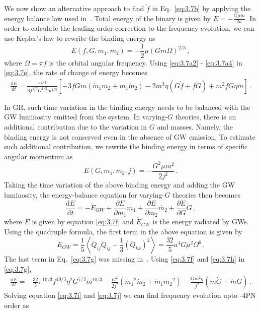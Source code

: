 \documentclass[11pt]{article}
\begin{document}
  \hspace{15.5pt} We now show an alternative approach to find $\dot f$ in Eq.~\eqref{eq:3.7b} by applying the energy balance law used in~\cite{Yunes:2009bv}. Total energy of the binary is given by $E=-\frac{G\mu m}{2a}$. In order to calculate the leading order correction to the frequency evolution, we can use Kepler's law to rewrite the binding energy as 
 \begin{equation}\label{eq:3.7e}
 E(f,G,m_1,m_2)=-\frac{1}{2}\mu (Gm\Omega)^{2/3}\,,
 \end{equation}
 where $\Omega=\pi f$ is the orbital angular frequency. Using \eqref{eq:3.7a2} - \eqref{eq:3.7a4} in  \eqref{eq:3.7e}, the rate of change of energy becomes
 \begin{align}\label{eq:3.7j}
 \frac{\mathrm{d} E}{\mathrm{d} t}=\frac{\pi^{2/3}}{6f^{1/3}G^{1/3}m^{4/3}}\left[-3fGm(\dot{m}_1m_2+m_1\dot{m}_2)-2m^3\eta(G\dot{f}+f\dot{G})+m^2fG\eta\dot{m}\right]\,.
 \end{align}
 
In GR, such time variation in the binding energy needs to be balanced with the GW luminosity emitted from the system. In varying-$G$ theories, there is an additional contribution due to the variation in $G$ and masses. Namely, the binding energy is not conserved even in the absence of GW emission. To estimate such additional contribution, we rewrite the binding energy in terms of specific angular momentum as
 \begin{equation}\label{eq:3.7f}
 E(G,m_1,m_2,j)=-\frac{G^2 \mu  m^2}{2 j^2}\,.
 \end{equation}
 \hspace*{15.5pt} Taking the time variation of the above binding energy and adding the GW luminosity, the energy-balance equation for varying-$G$ theories then becomes
 \begin{equation}\label{eq:3.7g}
\frac{\mathrm{d} E}{\mathrm{d} t}=-\dot{E}_{GW}+\frac{\partial E}{\partial m_1}\dot{m_1}+\frac{\partial E}{\partial m_2}\dot{m_2}+\frac{\partial E}{\partial G}\dot{G}\,,
 \end{equation}
 where $E$ is given by equation \eqref{eq:3.7f} and $\dot{E}_{GW}$ is the energy radiated by GWs. Using the quadruple formula, the first term in the above equation is given by
 \begin{equation}\label{eq:3.7h}
 \dot{E}_{GW}=\frac{1}{5}\left \langle\dddot{Q}_{ij}\dddot{Q}_{ij}-\frac{1}{3}(\dddot{Q}_{kk})^2\right \rangle=\frac{32}{5} a^4 G \mu ^2 \Omega ^6\,.
 \end{equation}
 The last term in Eq.~\eqref{eq:3.7g} was missing in~\cite{Yunes:2009bv}.
 Using \eqref{eq:3.7f} and \eqref{eq:3.7h} in \eqref{eq:3.7g},
 \begin{align}\label{eq:3.7i}
\frac{\mathrm{d} E}{\mathrm{d} t}=- \frac{32}{5} \pi ^{10/3} f^{10/3} \eta ^2 G^{7/3} m^{10/3}-\frac{G^2}{2j^2}({m_1}^2\dot{m}_2+\dot{m}_1{m_2}^2)-\frac{Gm^2\eta}{j^2}(m\dot{G}+\dot{m}G)\,.
 \end{align}
 \hspace{15.5pt}Solving equation \eqref{eq:3.7i} and \eqref{eq:3.7j} we can find frequency evolution upto -4PN order as
 
\end{document}
